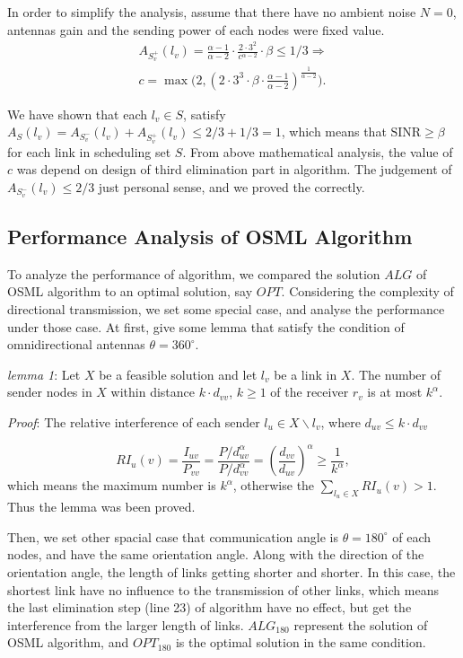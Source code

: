 \documentclass[conference]{IEEEtran}
\begin{document}
In order to simplify the analysis, assume that there have no ambient noise $N=0$, antennas gain and the sending power of each nodes were fixed value.
\begin{equation}\label{refer C}
\begin{split}
A_{S^+_v}(l_v)=\frac{\alpha-1}{\alpha-2} \cdot \frac{2 \cdot 3^2}{c^{\alpha-2}} \cdot \beta \leq 1/3 \Rightarrow \\
c=\max { \bigg( 2,(2 \cdot 3^3 \cdot \beta \cdot \frac{\alpha-1}{\alpha-2})^{\frac{1}{\alpha-2}}\bigg)}.
\end{split}
\end{equation}

We have shown that each $l_v \in S$, satisfy $A_S(l_v) = A_{S^-_v}(l_v) + A_{S^+_v}(l_v) \leq 2/3 +1/3=1$, which means that $\textrm{SINR} \geq \beta$ for each link in scheduling set $S$. From above mathematical analysis, the value of $c$ was depend on design of third elimination part in algorithm. The judgement of $A_{S^-_v}(l_v) \leq 2/3$ just personal sense, and we proved the correctly.

\subsection{Performance Analysis of OSML Algorithm}
To analyze the performance of algorithm, we compared the solution $ALG$ of OSML algorithm to an optimal solution, say $OPT$. Considering the complexity of directional transmission, we set some special case, and analyse the performance under those case. At first, give some lemma that satisfy the condition of omnidirectional antennas $\theta = 360^{\circ}$.

\emph{lemma 1}: Let $X$ be a feasible solution and let $l_v$ be a link in $X$. The number of sender nodes in $X$ within distance $k \cdot d_{vv}$, $k \geq 1$ of the receiver $r_v$ is at most $k^\alpha$.

\emph{Proof}: The relative interference of each sender $l_u \in X \backslash {l_v}$, where $d_{uv} \leq k \cdot d_{vv}$

\begin{equation*}
  RI_u(v)=\frac{I_{uv}}{P_{vv}}=\frac{P/d^\alpha_{uv}}{P/d^\alpha_{vv}}=(\frac{d_{vv}}{d_{uv}})^\alpha \geq \frac{1}{k^\alpha},
\end{equation*}
which means the maximum number is $k^{\alpha}$, otherwise the $\sum_{l_u \in X} RI_u(v) > 1$. Thus the lemma was been proved.

Then, we set other spacial case that communication angle is $\theta = 180^{\circ}$ of each nodes, and have the same orientation angle. Along with the direction of the orientation angle, the length of links getting shorter and shorter. In this case, the shortest link have no influence to the transmission of other links, which means the last elimination step (line 23) of algorithm have no effect, but get the interference from the larger length of links. $ALG_{180}$ represent the solution of OSML algorithm, and $OPT_{180}$ is the optimal solution in the same condition.
\end{document}
